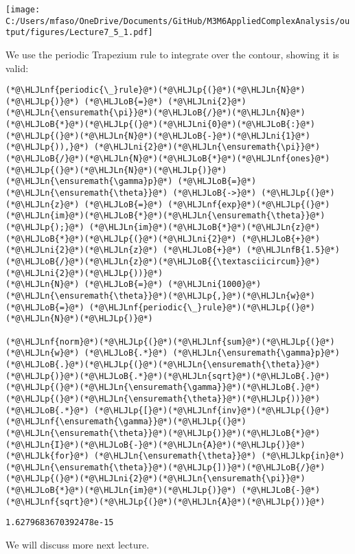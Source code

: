 \documentclass[12pt,a4paper]{article}
\newcommand{\HLJLk}[1]{\textcolor[RGB]{148,91,176}{\textbf{#1}}}
\newcommand{\HLJLkp}[1]{\textcolor[RGB]{148,91,176}{\textbf{#1}}}
\newcommand{\HLJLn}[1]{#1}
\newcommand{\HLJLnf}[1]{\textcolor[RGB]{66,102,213}{#1}}
\newcommand{\HLJLnfB}[1]{\textcolor[RGB]{59,151,46}{#1}}
\newcommand{\HLJLni}[1]{\textcolor[RGB]{59,151,46}{#1}}
\newcommand{\HLJLoB}[1]{\textcolor[RGB]{102,102,102}{\textbf{#1}}}
\newcommand{\HLJLp}[1]{#1}
\begin{document}
\texttt{[image: C:/Users/mfaso/OneDrive/Documents/GitHub/M3M6AppliedComplexAnalysis/output/figures/Lecture7\_5\_1.pdf]}

We use the periodic Trapezium rule to integrate over the contour, showing it is valid:


\begin{lstlisting}
(*@\HLJLnf{periodic{\_}rule}@*)(*@\HLJLp{(}@*)(*@\HLJLn{N}@*)(*@\HLJLp{)}@*) (*@\HLJLoB{=}@*) (*@\HLJLni{2}@*)(*@\HLJLn{\ensuremath{\pi}}@*)(*@\HLJLoB{/}@*)(*@\HLJLn{N}@*)(*@\HLJLoB{*}@*)(*@\HLJLp{(}@*)(*@\HLJLni{0}@*)(*@\HLJLoB{:}@*)(*@\HLJLp{(}@*)(*@\HLJLn{N}@*)(*@\HLJLoB{-}@*)(*@\HLJLni{1}@*)(*@\HLJLp{)),}@*) (*@\HLJLni{2}@*)(*@\HLJLn{\ensuremath{\pi}}@*)(*@\HLJLoB{/}@*)(*@\HLJLn{N}@*)(*@\HLJLoB{*}@*)(*@\HLJLnf{ones}@*)(*@\HLJLp{(}@*)(*@\HLJLn{N}@*)(*@\HLJLp{)}@*)
(*@\HLJLn{\ensuremath{\gamma}p}@*) (*@\HLJLoB{=}@*) (*@\HLJLn{\ensuremath{\theta}}@*) (*@\HLJLoB{->}@*) (*@\HLJLp{(}@*)(*@\HLJLn{z}@*) (*@\HLJLoB{=}@*) (*@\HLJLnf{exp}@*)(*@\HLJLp{(}@*)(*@\HLJLn{im}@*)(*@\HLJLoB{*}@*)(*@\HLJLn{\ensuremath{\theta}}@*)(*@\HLJLp{);}@*) (*@\HLJLn{im}@*)(*@\HLJLoB{*}@*)(*@\HLJLn{z}@*)(*@\HLJLoB{*}@*)(*@\HLJLp{(}@*)(*@\HLJLni{2}@*) (*@\HLJLoB{+}@*) (*@\HLJLni{2}@*)(*@\HLJLn{z}@*) (*@\HLJLoB{+}@*) (*@\HLJLnfB{1.5}@*)(*@\HLJLoB{/}@*)(*@\HLJLn{z}@*)(*@\HLJLoB{{\textasciicircum}}@*)(*@\HLJLni{2}@*)(*@\HLJLp{))}@*)
(*@\HLJLn{N}@*) (*@\HLJLoB{=}@*) (*@\HLJLni{1000}@*)
(*@\HLJLn{\ensuremath{\theta}}@*)(*@\HLJLp{,}@*)(*@\HLJLn{w}@*) (*@\HLJLoB{=}@*) (*@\HLJLnf{periodic{\_}rule}@*)(*@\HLJLp{(}@*)(*@\HLJLn{N}@*)(*@\HLJLp{)}@*)

(*@\HLJLnf{norm}@*)(*@\HLJLp{(}@*)(*@\HLJLnf{sum}@*)(*@\HLJLp{(}@*)(*@\HLJLn{w}@*) (*@\HLJLoB{.*}@*) (*@\HLJLn{\ensuremath{\gamma}p}@*)(*@\HLJLoB{.}@*)(*@\HLJLp{(}@*)(*@\HLJLn{\ensuremath{\theta}}@*)(*@\HLJLp{)}@*)(*@\HLJLoB{.*}@*)(*@\HLJLn{sqrt}@*)(*@\HLJLoB{.}@*)(*@\HLJLp{(}@*)(*@\HLJLn{\ensuremath{\gamma}}@*)(*@\HLJLoB{.}@*)(*@\HLJLp{(}@*)(*@\HLJLn{\ensuremath{\theta}}@*)(*@\HLJLp{))}@*) (*@\HLJLoB{.*}@*) (*@\HLJLp{[}@*)(*@\HLJLnf{inv}@*)(*@\HLJLp{(}@*)(*@\HLJLnf{\ensuremath{\gamma}}@*)(*@\HLJLp{(}@*)(*@\HLJLn{\ensuremath{\theta}}@*)(*@\HLJLp{)}@*)(*@\HLJLoB{*}@*)(*@\HLJLn{I}@*)(*@\HLJLoB{-}@*)(*@\HLJLn{A}@*)(*@\HLJLp{)}@*) (*@\HLJLk{for}@*) (*@\HLJLn{\ensuremath{\theta}}@*) (*@\HLJLkp{in}@*) (*@\HLJLn{\ensuremath{\theta}}@*)(*@\HLJLp{])}@*)(*@\HLJLoB{/}@*)(*@\HLJLp{(}@*)(*@\HLJLni{2}@*)(*@\HLJLn{\ensuremath{\pi}}@*)(*@\HLJLoB{*}@*)(*@\HLJLn{im}@*)(*@\HLJLp{)}@*) (*@\HLJLoB{-}@*) (*@\HLJLnf{sqrt}@*)(*@\HLJLp{(}@*)(*@\HLJLn{A}@*)(*@\HLJLp{))}@*)
\end{lstlisting}

\begin{lstlisting}
1.6279683670392478e-15
\end{lstlisting}


We will discuss more next lecture.
\end{document}
